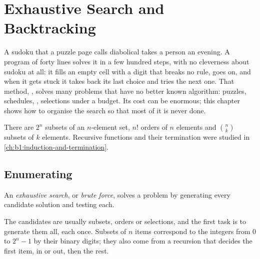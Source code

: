 \chapter{Exhaustive Search and Backtracking}\label{ch:b1:backtracking}

A sudoku that a puzzle page calls diabolical takes a person an evening. A program of forty lines solves it in a few
hundred steps, with no cleverness about sudoku at all: it fills an empty cell with a digit that breaks no rule, goes on,
and when it gets stuck it takes back its last choice and tries the next one. That method, , solves many
problems that have no better known algorithm: puzzles, schedules, , selections under a budget. Its cost can be
enormous; this chapter shows how to organise the search so that most of it is never done.

\begin{recall}
There are $2^n$ subsets of an $n$-element set, $n!$ orders of $n$ elements and $\binom nk$ subsets of $k$ elements.
Recursive functions and their termination were studied in \cref{ch:b1:induction-and-termination}.
\end{recall}

\section{Enumerating}\label{sec:b1:backtracking:enumerating}

\begin{definition}\label{def:b1:backtracking:exhaustive}
An \emph{exhaustive search}, or \emph{brute force}, solves a problem by
generating every candidate solution and testing each.
\end{definition}

The candidates are usually subsets, orders or selections, and the first task is to generate them all, each once. Subsets
of $n$ items correspond to the integers from 0 to $2^n - 1$ by their binary digits; they also come from a recursion that
decides the first item, in or out, then the rest.

\label{lst:b1:backtracking:subsets}

